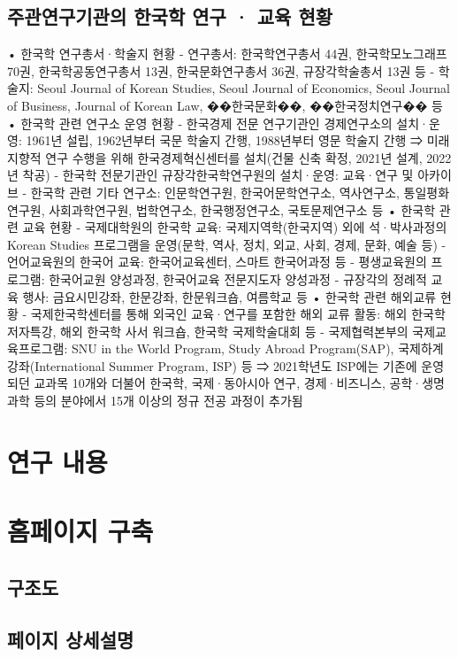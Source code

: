 \documentclass{article}
\begin{document}
\subsection{주관연구기관의 한국학 연구 · 교육 현황}
• 한국학 연구총서·학술지 현황
- 연구총서: 한국학연구총서 44권, 한국학모노그래프 70권, 한국학공동연구총서 13권, 한국문화연구총서 36권, 규장각학술총서 13권 등
- 학술지: Seoul Journal of Korean Studies, Seoul Journal of Economics, Seoul Journal of Business, Journal of Korean Law, ��한국문화��, ��한국정치연구�� 등
• 한국학 관련 연구소 운영 현황
- 한국경제 전문 연구기관인 경제연구소의 설치·운영: 1961년 설립, 1962년부터 국문 학술지 간행, 1988년부터 영문 학술지 간행 ⇒ 미래지향적 연구 수행을 위해 한국경제혁신센터를 설치(건물 신축 확정, 2021년 설계, 2022년 착공)
- 한국학 전문기관인 규장각한국학연구원의 설치·운영: 교육·연구 및 아카이브
- 한국학 관련 기타 연구소: 인문학연구원, 한국어문학연구소, 역사연구소, 통일평화연구원, 사회과학연구원, 법학연구소, 한국행정연구소, 국토문제연구소 등
• 한국학 관련 교육 현황
- 국제대학원의 한국학 교육: 국제지역학(한국지역) 외에 석·박사과정의 Korean Studies 프로그램을 운영(문학, 역사, 정치, 외교, 사회, 경제, 문화, 예술 등)
- 언어교육원의 한국어 교육: 한국어교육센터, 스마트 한국어과정 등
- 평생교육원의 프로그램: 한국어교원 양성과정, 한국어교육 전문지도자 양성과정
- 규장각의 정례적 교육 행사: 금요시민강좌, 한문강좌, 한문워크숍, 여름학교 등
• 한국학 관련 해외교류 현황
- 국제한국학센터를 통해 외국인 교육·연구를 포함한 해외 교류 활동: 해외 한국학 저자특강, 해외 한국학 사서 워크숍, 한국학 국제학술대회 등
- 국제협력본부의 국제교육프로그램: SNU in the World Program, Study Abroad Program(SAP), 국제하계강좌(International Summer Program, ISP) 등 ⇒ 2021학년도 ISP에는 기존에 운영되던 교과목 10개와 더불어 한국학, 국제·동아시아 연구, 경제·비즈니스, 공학·생명과학 등의 분야에서 15개 이상의 정규 전공 과정이 추가됨


\section{연구 내용}


\section{홈페이지 구축}
\subsection{구조도}





\subsection{페이지 상세설명}
\end{document}
